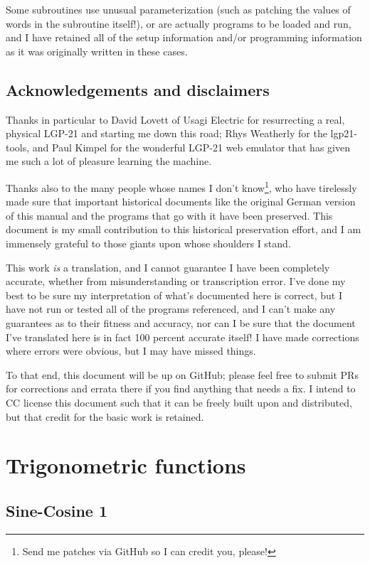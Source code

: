 \documentclass{article}
\begin{document}
Some subroutines use unusual parameterization (such as patching the values of words in the subroutine itself!), or are actually programs to be loaded and run, and I have retained all of the setup information and/or programming information as it was originally written in these cases.

\subsection{Acknowledgements and disclaimers}
Thanks in particular to David Lovett of Usagi Electric for resurrecting a real, physical LGP-21 and starting me down this road; Rhys Weatherly for the lgp21-tools, and Paul Kimpel for the wonderful LGP-21 web emulator that has given me such a lot of pleasure learning the machine.

Thanks also to the many people whose names I don't know\footnote{Send me patches via GitHub so I can credit you, please!}, who have tirelessly made sure that important historical documents like the original German version of this manual and the programs that go with it have been preserved. This document is my small contribution to this historical preservation effort, and I am immensely grateful to those giants upon whose shoulders I stand. 

This work \emph{is} a translation, and I cannot guarantee I have been completely accurate, whether from misunderstanding or transcription error. I've done my best to be sure my interpretation of what's documented here is correct, but I have not run or tested all of the programs referenced, and I can't make any guarantees as to their fitness and accuracy, nor can I be sure that the document I've translated here is in fact 100 percent accurate itself! I have made corrections where
errors were obvious, but I may have missed things.

To that end, this document will be up on GitHub; please feel free to submit PRs for corrections and errata there if you find anything that needs a fix. I intend to CC license this document such that it can be freely built upon and distributed, but that credit for the basic work is retained.

\newpage
\section{Trigonometric functions}

\subsection{Sine-Cosine 1}
\label{sec:sine_cosine_1}
\end{document}
